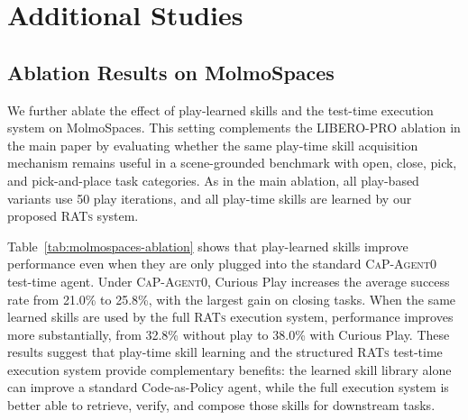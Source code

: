 


    










\section{Additional Studies}
\label{sec:appendix_additional_studies}

\subsection{Ablation Results on MolmoSpaces}

We further ablate the effect of play-learned skills and the test-time execution system on
MolmoSpaces. This setting complements the LIBERO-PRO ablation in the main paper by evaluating
whether the same play-time skill acquisition mechanism remains useful in a scene-grounded
benchmark with open, close, pick, and pick-and-place task categories. As in the main ablation, all
play-based variants use 50 play iterations, and all play-time skills are learned by our proposed
\textsc{RATs} system.

Table~\ref{tab:molmospaces-ablation} shows that play-learned skills improve performance even when
they are only plugged into the standard \textsc{CaP-Agent0} test-time agent. Under \textsc{CaP-Agent0},
Curious Play increases the average success rate from 21.0\% to 25.8\%, with the largest gain on
closing tasks. When the same learned skills are used by the full \textsc{RATs} execution system,
performance improves more substantially, from 32.8\% without play to 38.0\% with Curious Play.
These results suggest that play-time skill learning and the structured \textsc{RATs} test-time
execution system provide complementary benefits: the learned skill library alone can improve a
standard Code-as-Policy agent, while the full execution system is better able to retrieve, verify, and
compose those skills for downstream tasks.

